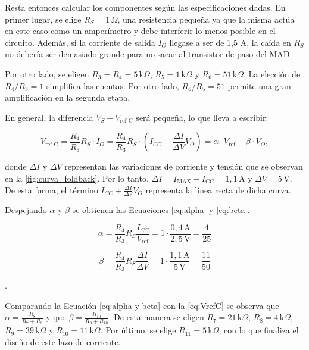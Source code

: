 \documentclass[a4paper,12pt]{article}
\begin{document}
Resta entonces calcular los componentes según las especificaciones dadas. En primer lugar, se elige $R_S = 1 \, \Omega$, una resistencia pequeña ya que la misma actúa en este caso como un amperímetro y debe interferir lo menos posible en el circuito. Además, si la corriente de salida $I_O$ llegase a ser de 1,5 A, la caída en $R_S$ no debería ser demasiado grande para no sacar al transistor de paso del MAD.

Por otro lado, se eligen $R_3 = R_4 = 5 \, \text{k}\Omega$, $R_5 = 1 \, \text{k}\Omega$ y $R_6 = 51 \, \text{k} \Omega$. La elección de $R_4/R_3 = 1$ simplifica las cuentas. Por otro lado, $R_6/R_5 = 51$ permite una gran amplificación en la segunda etapa. 

En general, la diferencia $V_S - V_{\text{ref-C}}$ será pequeña, lo que lleva a escribir:

\begin{equation}
    V_{\text{ref-C}} = \frac{R_4}{R_3} R_S \cdot I_O = \frac{R_4}{R_3} R_S \cdot \left(I_{CC} + \frac{\Delta I}{\Delta V} V_O\right) = \alpha \cdot V_{\text{ref}} + \beta \cdot V_O,
    \label{eq:alpha y beta}
\end{equation}

donde $\Delta I$ y $\Delta V$ representan las variaciones de corriente y tensión que se observan en la \autoref{fig:curva_foldback}. Por lo tanto, $\Delta I = I_{\text{MAX}} - I_{\text{CC}} =1,1 \, \text{A}$ y $\Delta V = 5 \, \text{V}$. De esta forma, el término $I_{CC} + \frac{\Delta I}{\Delta V} V_O$ representa la línea recta de dicha curva. 

Despejando $\alpha$ y $\beta$ se obtienen las Ecuaciones \ref{eq:alpha} y \ref{eq:beta}.

\begin{minipage}{0.45\textwidth}
    \begin{equation}
    \alpha = \frac{R_4}{R_3} R_S \frac{I_{CC}}{V_{\text{ref}}} = 1 \cdot\frac{0,4 \,\text{A}}{2,5 \,\text{V}}  = \frac{4}{25}
    \label{eq:alpha}
    \end{equation}
\end{minipage}
\hfill
\begin{minipage}{0.45\textwidth}
    \begin{equation}
    \beta = \frac{R_4}{R_3} R_S \frac{\Delta I}{\Delta V} = 1\cdot \frac{1,1 \,\text{A}}{5 \,\text{V}} = \frac{11}{50}
    \label{eq:beta}
    \end{equation}
\end{minipage}.

Comparando la Ecuación \ref{eq:alpha y beta} con la \ref{eq:VrefC} se observa que $\alpha = \frac{R_8}{R_7 + R_8}$ y que $\beta = \frac{R_{10}}{R_9 + R_{10}}$. De esta manera se eligen $R_7 = 21 \,\text{k} \Omega$, $R_8 = 4 \,\text{k} \Omega$, $R_9 = 39 \,\text{k} \Omega$ y $R_{10} = 11 \,\text{k} \Omega$. Por último, se elige $R_{11} = 5 \,\text{k} \Omega$, con lo que finaliza el diseño de este lazo de corriente. 
\end{document}
